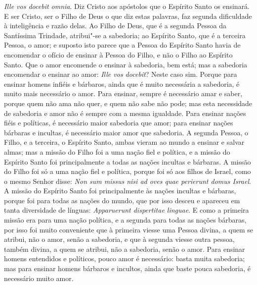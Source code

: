 \emph{Ille vos docebit omnia}. Diz Cristo aos apóstolos que o Espírito
Santo os ensinará. E ser Cristo, ser o Filho de Deus o que diz estas
palavras, faz segunda dificuldade à inteligência e razão delas. Ao Filho
de Deus, que é a segunda Pessoa da Santíssima Trindade, atribui"-se a
sabedoria; ao Espírito Santo, que é a terceira Pessoa, o amor; e suposto
isto parece que a Pessoa do Espírito Santo havia de encomendar o ofício
de ensinar à Pessoa do Filho, e não o Filho ao Espírito Santo. Que o
amor encomende o ensinar à sabedoria, bem está; mas a sabedoria
encomendar o ensinar ao amor: \emph{Ille vos docebit}? Neste caso sim.
Porque para ensinar homens infiéis e bárbaros, ainda que é muito
necessária a sabedoria, é muito mais necessário o amor. Para ensinar,
sempre é necessário amar e saber, porque quem não ama não quer, e quem
não sabe não pode; mas esta necessidade de sabedoria e amor não é sempre
com a mesma igualdade. Para ensinar nações fiéis e políticas, é
necessário maior sabedoria que amor;
para ensinar nações bárbaras e incultas, é necessário maior amor que
sabedoria. A segunda Pessoa, o Filho, e a terceira, o Espírito Santo,
ambas vieram ao mundo a ensinar e salvar almas; mas a missão do Filho
foi a uma nação fiel e política, e a missão do Espírito Santo foi
principalmente a todas as nações incultas e bárbaras. A missão do Filho
foi só a uma nação fiel e política, porque foi só aos filhos de Israel,
como o mesmo Senhor disse: \emph{Non sum missus nisi ad oves quae
perierunt domus Israel}. A missão do Espírito Santo foi principalmente
às nações incultas e bárbaras, porque foi para todas as nações do mundo,
que por isso desceu e apareceu em tanta diversidade de línguas:
\emph{Apparuerunt dispertitae linguae}. E como a primeira missão era
para uma nação política, e a segunda para todas as nações bárbaras, por
isso foi muito conveniente que à primeira viesse uma Pessoa divina, a
quem se atribui, não o amor, senão a sabedoria, e que à segunda viesse
outra pessoa, também divina, a quem se atribui, não a sabedoria, senão o
amor. Para ensinar homens entendidos e políticos, pouco amor é
necessário: basta muita sabedoria; mas para ensinar homens bárbaros e
incultos, ainda que baste pouca sabedoria, é necessário muito amor.

